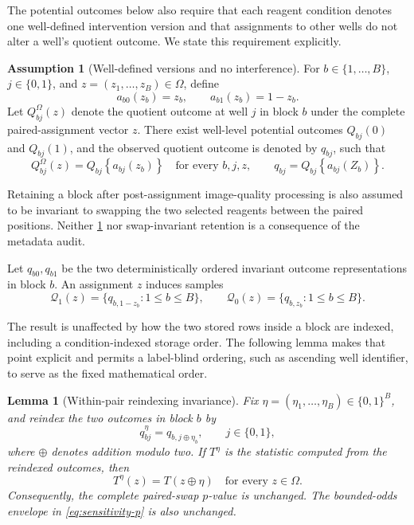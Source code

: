 \documentclass[11pt]{article}
\newtheorem{lemma}[theorem]{Lemma}
\theoremstyle{definition}
\newtheorem{assumption}[theorem]{Assumption}
\theoremstyle{remark}
\newcommand{\1}{\mathbf 1}
\begin{document}
The potential outcomes below also require that each reagent condition denotes
one well-defined intervention version and that assignments to other wells do
not alter a well's quotient outcome.  We state this requirement explicitly.

\begin{assumption}[Well-defined versions and no interference]
\label{ass:pair-sutva}
For \(b\in\{1,\ldots,B\}\), \(j\in\{0,1\}\), and
\(z=(z_1,\ldots,z_B)\in\Omega\), define
\[
 a_{b0}(z_b)=z_b,
 \qquad
 a_{b1}(z_b)=1-z_b.
\]
Let \(Q_{bj}^{\Omega}(z)\) denote the quotient outcome at well \(j\) in block
\(b\) under the complete paired-assignment vector \(z\).  There exist
well-level potential outcomes \(Q_{bj}(0)\) and \(Q_{bj}(1)\), and the observed
quotient outcome is denoted by \(q_{bj}\), such that
\begin{equation}\label{eq:pair-sutva}
 Q_{bj}^{\Omega}(z)
 =Q_{bj}\!\left\{a_{bj}(z_b)\right\}
 \quad\text{for every }b,j,z,
 \qquad
 q_{bj}=Q_{bj}\!\left\{a_{bj}(Z_b)\right\}.
\end{equation}
\end{assumption}

Retaining a block after post-assignment image-quality processing is also
assumed to be invariant to swapping the two selected reagents between the
paired positions.  Neither \cref{ass:pair-sutva} nor swap-invariant retention
is a consequence of the metadata audit.

Let \(q_{b0},q_{b1}\) be the two deterministically ordered invariant outcome
representations in block \(b\).  An assignment \(z\) induces samples
\[
 \mathcal Q_1(z)=\{q_{b,1-z_b}:1\le b\le B\},\qquad
 \mathcal Q_0(z)=\{q_{b,z_b}:1\le b\le B\}.
\]

The result is unaffected by how the two stored rows inside a block are
indexed, including a condition-indexed storage order.  The following lemma
makes that point explicit and permits a label-blind ordering, such as ascending
well identifier, to serve as the fixed mathematical order.

\begin{lemma}[Within-pair reindexing invariance]
\label{lem:pair-reindexing}
Fix \(\eta=(\eta_1,\ldots,\eta_B)\in\{0,1\}^B\), and reindex the two outcomes
in block \(b\) by
\[
 q_{bj}^{\eta}=q_{b,j\mathbin\oplus\eta_b},
 \qquad j\in\{0,1\},
\]
where \(\oplus\) denotes addition modulo two.  If \(T^\eta\) is the statistic
computed from the reindexed outcomes, then
\[
 T^\eta(z)=T(z\mathbin\oplus\eta)
 \quad\text{for every }z\in\Omega.
\]
Consequently, the complete paired-swap \(p\)-value is unchanged.  The
bounded-odds envelope in \cref{eq:sensitivity-p} is also unchanged.
\end{lemma}
\end{document}
